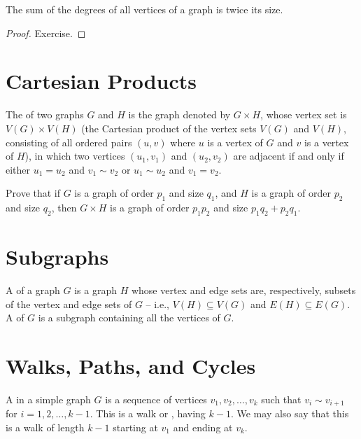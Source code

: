 \begin{Lemma}
The sum of the degrees of all vertices of a graph is twice its size.
\end{Lemma}

\begin{proof}
Exercise.
\end{proof}

\section{Cartesian Products}\label{sec:CartProds}

The  of two graphs $G$ and $H$ is the graph denoted by $G \times H$, whose vertex set is $V(G) \times V(H)$ (the Cartesian product of the vertex sets $V(G)$ and $V(H)$, consisting of all ordered pairs $(u, v)$ where $u$ is a vertex of $G$ and $v$ is a vertex of $H$), in which two vertices $(u_1, v_1)$ and $(u_2, v_2)$ are adjacent if and only if either $u_1 = u_2$ and $v_1 \sim v_2$ or $u_1 \sim u_2$ and $v_1 = v_2$.

\begin{Exercise}
Prove that if $G$ is a graph of order $p_1$ and size $q_1$, and $H$ is a graph of order $p_2$ and size $q_2$, then $G \times H$ is a graph of order $p_1 p_2$ and size $p_1 q_2 + p_2 q_1$.
\end{Exercise}

\section{Subgraphs}\label{sec:Subgraphs}

A  of a graph $G$ is a graph $H$ whose vertex and edge sets are, respectively, subsets of the vertex and edge sets of $G$ -- i.e., $V(H) \subseteq V(G)$ and $E(H) \subseteq E(G)$. A  of $G$ is a subgraph containing all the vertices of $G$.

\section{Walks, Paths, and Cycles}\label{sec:Walks}

A  in a simple graph $G$ is a sequence of vertices $v_1, v_2, \ldots, v_k$ such that $v_i \sim v_{i + 1}$ for $i = 1, 2, \ldots, k - 1$. This is a walk  or , having  $k - 1$. We may also say that this is a walk of length $k - 1$ starting at $v_1$ and ending at $v_k$.

